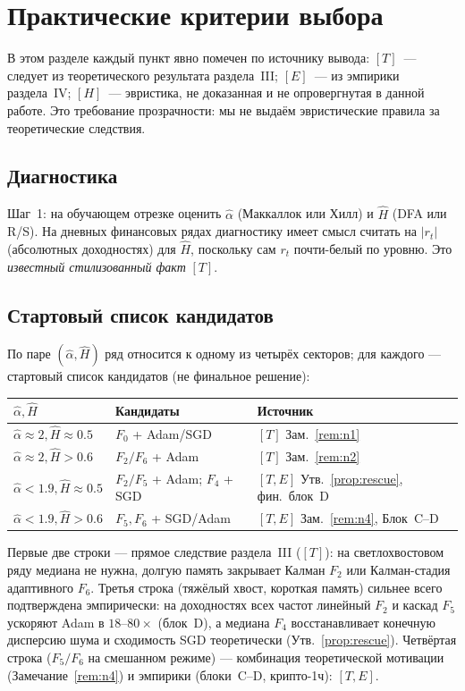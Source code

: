 \documentclass[conference]{IEEEtran}
\theoremstyle{plain}
\theoremstyle{definition}
\begin{document}
\section{Практические критерии выбора}

В этом разделе каждый пункт явно помечен по источнику
вывода: $[T]$~--- следует из теоретического результата раздела~III;
$[E]$~--- из эмпирики раздела~IV; $[H]$~--- эвристика, не доказанная и
не опровергнутая в данной работе. Это требование прозрачности: мы
не выдаём эвристические правила за теоретические следствия.

\subsection{Диагностика}
Шаг~1: на обучающем отрезке оценить $\hat\alpha$ (Маккаллок или Хилл)
и $\hat H$ (DFA или R/S). На дневных финансовых рядах диагностику
имеет смысл считать на $|r_t|$ (абсолютных доходностях) для $\hat H$,
поскольку сам $r_t$ почти-белый по уровню. Это \emph{известный
стилизованный факт} \cite{cont2001} $[T]$.

\subsection{Стартовый список кандидатов}
По паре $(\hat\alpha,\hat H)$ ряд относится к одному из четырёх
секторов; для каждого --- стартовый список кандидатов (не финальное
решение):

\begin{tabular}{lll}
\toprule
$\hat\alpha,\hat H$ & Кандидаты & Источник\\
\midrule
$\hat\alpha\approx2,\hat H\approx0.5$ & $F_0$ + Adam/SGD & $[T]$ Зам.~\ref{rem:n1}\\
$\hat\alpha\approx2,\hat H{>}0.6$ & $F_2/F_6$ + Adam & $[T]$ Зам.~\ref{rem:n2}\\
$\hat\alpha{<}1.9,\hat H\approx0.5$ & $F_2/F_5$ + Adam; $F_4$ + SGD & $[T,E]$ Утв.~\ref{prop:rescue}, фин.\ блок~D\\
$\hat\alpha{<}1.9,\hat H{>}0.6$ & $F_5,F_6$ + SGD/Adam & $[T,E]$ Зам.~\ref{rem:n4}, Блок~C--D\\
\bottomrule
\end{tabular}

Первые две строки --- прямое следствие раздела~III ($[T]$): на
светлохвостовом ряду медиана не нужна, долгую память закрывает Калман
$F_2$ или Калман-стадия адаптивного $F_6$. Третья строка (тяжёлый хвост,
короткая память) сильнее всего подтверждена эмпирически: на доходностях
всех частот линейный $F_2$ и каскад $F_5$ ускоряют Adam в $18$--$80\times$
(блок~D), а медиана $F_4$ восстанавливает конечную дисперсию шума и
сходимость SGD теоретически (Утв.~\ref{prop:rescue}). Четвёртая строка
($F_5/F_6$ на смешанном режиме) --- комбинация теоретической
мотивации (Замечание~\ref{rem:n4}) и эмпирики (блоки~C--D, крипто-1ч):
$[T,E]$.
\end{document}
